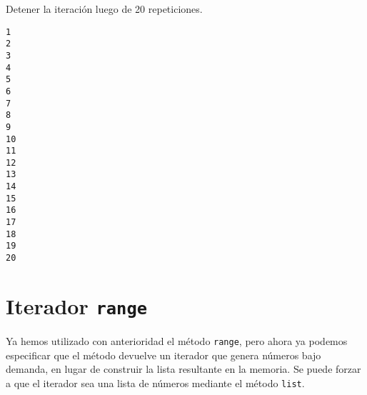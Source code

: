 \begin{code}
Detener la iteración luego de 20 repeticiones.

\begin{Shaded}
\begin{Highlighting}[]
   \NormalTok{(}\NormalTok{):}
    \OperatorTok{=} 
     

   \NormalTok{(}\NormalTok{):}
     \OperatorTok{\textless{}=} \NormalTok{:}
\OperatorTok{=} 
      \OperatorTok{+=} 
    \NormalTok{:}
       

\OperatorTok{=}
\OperatorTok{=} 

\end{Highlighting}
\end{Shaded}

\begin{verbatim}
1
2
3
4
5
6
7
8
9
10
11
12
13
14
15
16
17
18
19
20
\end{verbatim}
\end{code}

\section{\texorpdfstring{Iterador \texttt{range}}{Iterador range}}

Ya hemos utilizado con anterioridad el método \texttt{range}, pero ahora
ya podemos especificar que el método devuelve un iterador que genera
números bajo demanda, en lugar de construir la lista resultante en la
memoria. Se puede forzar a que el iterador sea una lista de números
mediante el método \texttt{list}.\\

